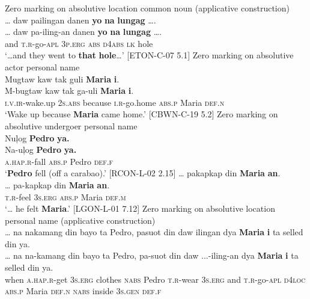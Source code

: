 \newpage
\ea
Zero marking on absolutive location common noun (applicative construction) \\
… daw  pailingan  danen \textbf{yo}  \textbf{na}  \textbf{lungag} …. \\\smallskip
 \gll … daw  pa-iling-an  danen \emptyset{} \textbf{yo}  \textbf{na}  \textbf{lungag} …. \\
{} and \textsc{t.r}-go-\textsc{apl}  3\textsc{p.erg} \textsc{abs} \textsc{d4abs}  \textsc{lk} hole \\
\glt ‘…and they went to \textbf{that} \textbf{hole}…’ [ETON-C-07 5.1] 
\z
\ea
Zero marking on absolutive actor personal name \\
Mugtaw  kaw  tak  guli \textbf{Maria}  \textbf{i}. \\\smallskip
 \gll M-bugtaw  kaw  tak  ga-uli \emptyset{} \textbf{Maria}  \textbf{i}. \\
\textsc{i.v.ir}-wake.up  \textsc{2}\textsc{s.abs}  because  \textsc{i.r}-go.home \textsc{abs.p} Maria  \textsc{def.n} \\
\glt ‘Wake up because \textbf{Maria} came home.’ [CBWN-C-19 5.2]
\z
\ea
Zero marking on absolutive undergoer personal name \\
Nuļog \textbf{Pedro}  \textbf{ya.} \\\smallskip
 \gll Na-uļog \emptyset{} \textbf{Pedro}  \textbf{ya.} \\
\textsc{a.hap.r}-fall \textsc{abs.p} Pedro  \textsc{def.f} \\
\glt ‘\textbf{Pedro} fell (off a carabao).’ [RCON-L-02 2.15]
\z
\ea
… pakapkap  din \textbf{Maria}  \textbf{an}. \\\smallskip
 \gll … pa-kapkap  din \emptyset{} \textbf{Maria}  \textbf{an}. \\
{} \textsc{t.r}-feel 3\textsc{s.erg} \textsc{abs.p} Maria  \textsc{def.m} \\
\glt ‘… he felt \textbf{Maria}.’ [LGON-L-01 7.12]
\z
\ea
Zero marking on absolutive location personal name (applicative construction) \\
… na  nakamang  din  bayo  ta  Pedro,  pasuot  din daw  ilingan  dya \textbf{Maria}  \textbf{i}  ta  selled  din  ya. \\\smallskip
 \gll … na  na-kamang  din  bayo  ta  Pedro,  pa-suot  din daw  ...-iling-an\footnotemark{}  dya  \emptyset{} \textbf{Maria}  \textbf{i}  ta  selled  din  ya. \\
{} when  \textsc{a.hap.r}\textsc{-}get  3\textsc{s.erg} clothes \textsc{nabs}  Pedro  \textsc{t.r}-wear  3\textsc{s.erg} and \textsc{t.r}-go-\textsc{apl}  \textsc{d4loc} \textsc{abs.p} Maria  \textsc{def.n}  \textsc{nabs}  inside  3\textsc{s.gen}  \textsc{def.f} \\
